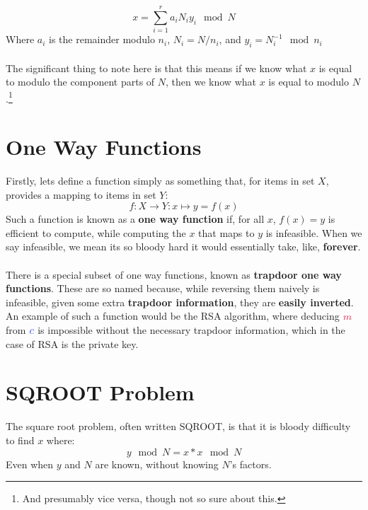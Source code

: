         $$ x = \sum\limits_{i=1}^{r} a_i N_i y_i \mod N $$
        Where $a_i$ is the remainder modulo $n_i$, $N_i = N/n_i$, and $y_i = N_i^{-1} \mod n_i$\\
        \\
        The significant thing to note here is that this means if we know what $x$ is equal to modulo the component parts of $N$, then we know what $x$ is equal to modulo $N$.\footnote{And presumably vice versa, though not so sure about this.}

    
    \section{One Way Functions}
        Firstly, lets define a function simply as something that, for items in set $X$, provides a mapping to items in set $Y$:
        $$f\colon X \rightarrow Y : x \mapsto y = f(x)$$
        Such a function is known as a \textbf{one way function} if, for all $x$, $f(x) = y$ is efficient to compute, while computing the $x$ that maps to $y$ is infeasible. When we say infeasible, we mean its so bloody hard it would essentially take, like, \textbf{forever}.\\
        \\
        There is a special subset of one way functions, known as \textbf{trapdoor one way functions}. These are so named because, while reversing them naively is infeasible, given some extra \textbf{trapdoor information}, they are \textbf{easily inverted}. An example of such a function would be the RSA algorithm, where deducing $\cm$ from $\cc$ is impossible without the necessary trapdoor information, which in the case of RSA is the private key.

    \section{SQROOT Problem}
        The square root problem, often written SQROOT, is that it is bloody difficulty to find $x$ where:
            $$y \mod N =  x * x \mod N $$
        Even when $y$ and $N$ are known, without knowing $N$'s factors.

    
